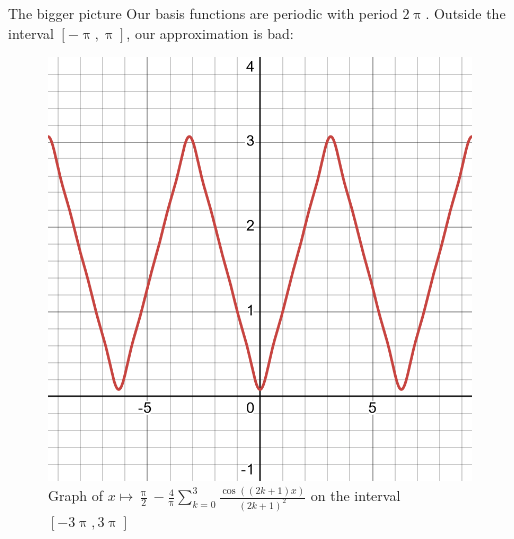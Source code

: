 \documentclass[portrait,fleqn,12pt]{beamer}
\begin{document}
\begin{frame}{The bigger picture}
  Our basis functions are periodic with period $2 \uppi$. Outside
  the interval $[-\uppi, \uppi]$, our approximation is bad:
  \begin{center}
    \begin{figure}
  \includegraphics[scale=0.15]{desmos-graph(22).png}
  \caption{Graph of $x\mapsto \frac{\uppi}{2} 
  - \frac{4}{\uppi}
    \sum_{k=0}^3 \frac{\cos((2 k+1) x)}{(2k+1)^2}$
    on the interval $[-3\uppi, 3\uppi]$}
    \end{figure}
  \end{center}
\end{frame}
\end{document}
